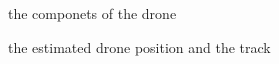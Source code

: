 \documentclass[lettersize,journal]{IEEEtran}
\begin{document}
\begin{figure}[h]
  \begin{center}
  \end{center}
  \caption{the componets of the drone}
  \label{fig:drone}
\end{figure}

\begin{figure}[h]
  \begin{center}
  \end{center}
  \caption{the estimated drone position and the track}
  \label{fig:drone_posi}
\end{figure}
\end{document}
